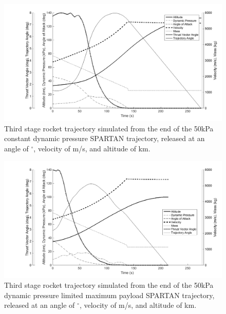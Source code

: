 \begin{figure}[ht]
	\centering
	\includegraphics[width=0.8\linewidth]{figures/5_Ascent/ThirdStageConstQ}
	\caption{Third stage rocket trajectory simulated from the end of the 50kPa constant dynamic pressure SPARTAN trajectory, released at an angle of \SeparationAngleConstq $^\circ$, velocity of \SeparationvConstq m/s, and altitude of \SeparationAltConstq km.}
	\label{fig:ThirdStageConstQ}
\end{figure}
\begin{figure}[ht]
	
	\centering
	\includegraphics[width=0.8\linewidth]{figures/5_Ascent/ThirdStage50kpaConstrained}
	\caption{Third stage rocket trajectory simulated from the end of the 50kPa dynamic pressure limited maximum payload SPARTAN trajectory, released at an angle of \SeparationAngleFiftykPa $^\circ$, velocity of \SeparationvFiftykPa m/s, and altitude of \SeparationAltFiftykPa km.}
	\label{fig:ThirdStage50kPa}
\end{figure}